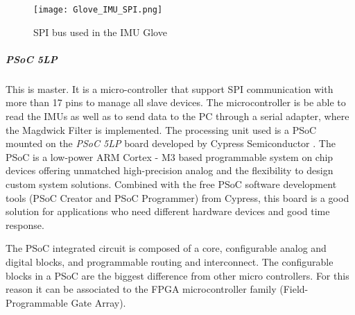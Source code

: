 \begin{figure}[h]
\centering
\texttt{[image: Glove\_IMU\_SPI.png]}
\caption{SPI bus used in the IMU Glove}
\label{fig:IMU_Glove_bus}
\end{figure}


\subparagraph{PSoC 5LP}

This is master. It is a micro-controller that support SPI communication with more than 17 pins to manage all slave devices. The microcontroller is be able to read the IMUs as well as to send data to the PC through a serial adapter, where the Magdwick Filter is implemented. The processing unit used is a PSoC mounted on the \textit{PSoC 5LP} board developed by Cypress Semiconductor \cite{PSOC5LP}. The PSoC is a low-power ARM \textsuperscript \textregistered Cortex - M3 based programmable system on chip devices offering unmatched high-precision analog and the flexibility to design custom system solutions. Combined with the free PSoC software development tools (PSoC Creator and
PSoC Programmer) from Cypress, this board is a good solution for applications who need different hardware devices and good time response. %

The PSoC integrated circuit is composed of a core, configurable analog and digital blocks, and programmable routing and interconnect. The configurable blocks in a PSoC are the biggest difference from other micro controllers. For this reason it can be associated to the FPGA microcontroller family (Field-Programmable Gate Array).


